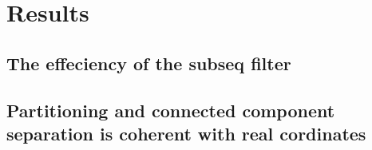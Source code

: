 \chapter{Results}

\section{The effeciency of the subseq filter}

\section{Partitioning and connected component separation is coherent with real cordinates}

\section{}

\newpage